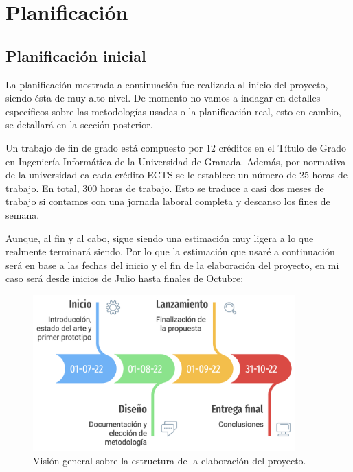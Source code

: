 \chapter{Planificación}\label{ch:planificacion}

\section{Planificación inicial}
La planificación mostrada a continuación fue realizada al inicio del proyecto, siendo ésta de muy alto nivel. De momento no vamos a indagar en detalles específicos sobre las metodologías usadas o la planificación real, esto en cambio, se detallará en la sección posterior.

\vspace{0.3cm}

Un trabajo de fin de grado está compuesto por 12 créditos en el Título de Grado en Ingeniería Informática de la Universidad de Granada. Además, por normativa de la universidad ea cada crédito ECTS se le establece un número de 25 horas de trabajo. En total, 300 horas de trabajo. Esto se traduce a casi dos meses de trabajo si contamos con una jornada laboral completa y descanso los fines de semana.

\vspace{0.3cm}

Aunque, al fin y al cabo, sigue siendo una estimación muy ligera a lo que realmente terminará siendo. Por lo que la estimación que usaré a continuación será en base a las fechas del inicio y el fin de la elaboración del proyecto, en mi caso será desde inicios de Julio hasta finales de Octubre:

\vspace{0.3cm}

\begin{figure}[bth]

    \myfloatalign
    \includegraphics[width=0.9\textwidth]{gfx/plan-simple.png}
    \caption[Planificación inicial del proyecto]{Visión general sobre la estructura de la elaboración del proyecto.}\label{gfx:plan-simple}

\end{figure}

